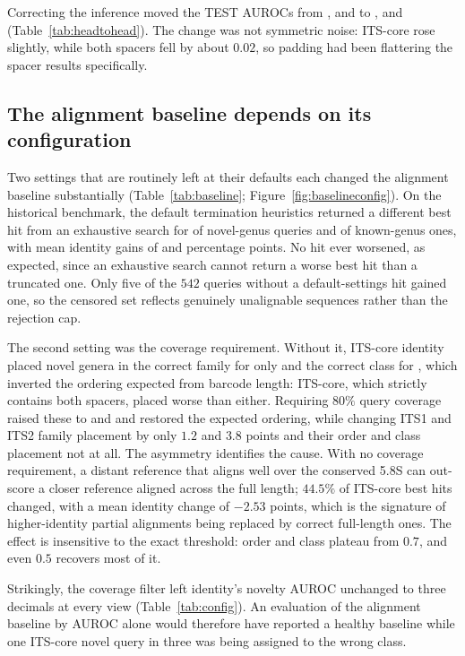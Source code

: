 \documentclass[11pt]{article}
\begin{document}
Correcting the inference moved the TEST AUROCs from \MsAUCCore{}, \MsAUCOne{}
and \MsAUCTwo{} to \MfAUCCore{}, \MfAUCOne{} and \MfAUCTwo{}
(Table~\ref{tab:headtohead}). The change was not symmetric noise: ITS-core rose
slightly, while both spacers fell by about $0.02$, so padding had been
flattering the spacer results specifically.



\subsection{The alignment baseline depends on its configuration}
\label{sec:baseline}
Two settings that are routinely left at their defaults each changed the
alignment baseline substantially (Table~\ref{tab:baseline};
Figure~\ref{fig:baselineconfig}). On the historical benchmark, the default
termination heuristics returned a different best hit from an exhaustive search
for \AudLgoPct{} of novel-genus queries and \AudLsoPct{} of known-genus ones,
with mean identity gains of \AudLgoGain{} and \AudLsoGain{} percentage points.
No hit ever worsened, as expected, since an exhaustive search cannot return a
worse best hit than a truncated one. Only five of the $542$ queries without a
default-settings hit gained one, so the censored set reflects genuinely
unalignable sequences rather than the rejection cap.

The second setting was the coverage requirement. Without it, ITS-core identity
placed novel genera in the correct family for only \CovNoneFam{} and the correct
class for \CovNoneCls{}, which inverted the ordering expected from barcode
length: ITS-core, which strictly contains both spacers, placed worse than
either. Requiring $80\%$ query coverage raised these to \CovEightFam{} and
\CovEightCls{} and restored the expected ordering, while changing ITS1 and ITS2
family placement by only $1.2$ and $3.8$ points and their order and class
placement not at all. The asymmetry identifies the cause. With no coverage
requirement, a distant reference that aligns well over the conserved 5.8S can
out-score a closer reference aligned across the full length; $44.5\%$ of
ITS-core best hits changed, with a mean identity change of $-2.53$ points, which
is the signature of higher-identity partial alignments being replaced by correct
full-length ones. The effect is insensitive to the exact threshold: order and
class plateau from $0.7$, and even $0.5$ recovers most of it.

Strikingly, the coverage filter left identity's novelty AUROC unchanged to three
decimals at every view (Table~\ref{tab:config}). An evaluation of the alignment
baseline by AUROC alone would therefore have reported a healthy baseline while
one ITS-core novel query in three was being assigned to the wrong class.
\end{document}

